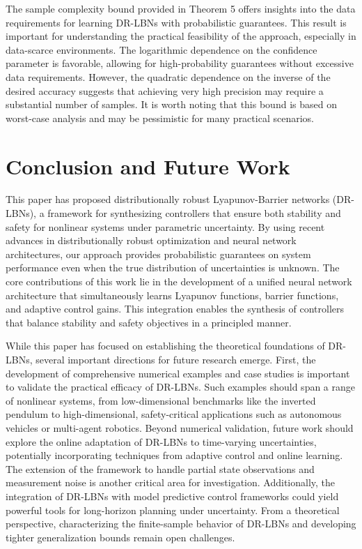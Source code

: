 \documentclass[11pt, oneside]{article}
\begin{document}
 The sample complexity bound provided in Theorem 5 offers insights into the data requirements for learning DR-LBNs with probabilistic guarantees. This result is important for understanding the practical feasibility of the approach, especially in data-scarce environments. The logarithmic dependence on the confidence parameter is favorable, allowing for high-probability guarantees without excessive data requirements. However, the quadratic dependence on the inverse of the desired accuracy suggests that achieving very high precision may require a substantial number of samples. It is worth noting that this bound is based on worst-case analysis and may be pessimistic for many practical scenarios. 


\section{Conclusion and Future Work}

This paper has proposed distributionally robust Lyapunov-Barrier networks (DR-LBNs), a framework for synthesizing controllers that ensure both stability and safety for nonlinear systems under parametric uncertainty. By using recent advances in distributionally robust optimization and neural network architectures, our approach provides probabilistic guarantees on system performance even when the true distribution of uncertainties is unknown. The core contributions of this work lie in the development of a unified neural network architecture that simultaneously learns Lyapunov functions, barrier functions, and adaptive control gains. This integration enables the synthesis of controllers that balance stability and safety objectives in a principled manner. 

 While this paper has focused on establishing the theoretical foundations of DR-LBNs, several important directions for future research emerge. First, the development of comprehensive numerical examples and case studies is important to validate the practical efficacy of DR-LBNs. Such examples should span a range of nonlinear systems, from low-dimensional benchmarks like the inverted pendulum to high-dimensional, safety-critical applications such as autonomous vehicles or multi-agent robotics. Beyond numerical validation, future work should explore the online adaptation of DR-LBNs to time-varying uncertainties, potentially incorporating techniques from adaptive control and online learning. The extension of the framework to handle partial state observations and measurement noise is another critical area for investigation. Additionally, the integration of DR-LBNs with model predictive control frameworks could yield powerful tools for long-horizon planning under uncertainty. From a theoretical perspective, characterizing the finite-sample behavior of DR-LBNs and developing tighter generalization bounds remain open challenges. 




\end{document}
